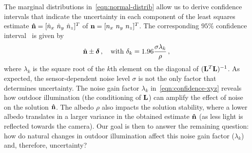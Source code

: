 The marginal distributions in~\eqref{eqn:normal-distrib} allow us to derive confidence intervals that indicate the uncertainty in each component of the least squares estimate ${\bf \hat n} = [ \hat n_x \ \hat n_y \ \hat n_z ]^T$ of ${\bf n} = [ n_x \ n_y \ n_z ]^T$. The corresponding $95\%$ confidence interval~\cite{hastie-book-09} is given by
%
\begin{equation}
\hat{\mathbf{n}} \pm \boldsymbol \delta \,, \quad \text{with } \delta_k = 1.96 \frac{\sigma\lambda_k}{\rho} \,,
\label{eqn:confidence-xyz}
\end{equation}
%
where $\lambda_k$ is the square root of the $k$th element on the diagonal of $({\bf L}^T{\bf L})^{-1}$. As expected, the sensor-dependent noise level $\sigma$ is not the only factor that determines uncertainty. The noise gain factor $\lambda_k$ in~\eqref{eqn:confidence-xyz} reveals how outdoor illumination (the conditioning of ${\bf L}$) can amplify the effect of noise on the solution ${\bf \hat n}$. The albedo $\rho$ also impacts the solution stability, where a lower albedo translates in a larger variance in the obtained estimate $\bf \hat n$ (as less light is reflected towards the camera). Our goal is then to answer the remaining question: how do natural changes in outdoor illumination affect this noise gain factor ($\lambda_k$) and, therefore, uncertainty?



%
%
%

